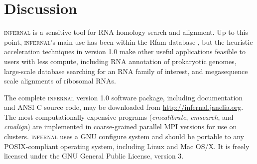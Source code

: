 \section{Discussion}

\textsc{infernal} is a sensitive tool for RNA homology search and
alignment. Up to this point, \textsc{infernal}'s main use has been
within the Rfam database \cite{Gardner09}, but the heuristic
acceleration techniques in version 1.0 make other useful applications
feasible to users with less compute, including RNA annotation of
prokaryotic genomes, large-scale database searching for an RNA
family of interest, and megasequence scale alignments of ribosomal
RNAs.  






The complete \textsc{infernal} version 1.0 software package, including
documentation and ANSI C source code, may be downloaded from
\url{http://infernal.janelia.org}. The most computationally expensive
programs (\emph{cmcalibrate}, \emph{cmsearch}, and \emph{cmalign}) are
implemented in coarse-grained parallel MPI versions for use on
clusters.  \textsc{infernal} uses a GNU configure system and should be
portable to any POSIX-compliant operating system, including Linux and
Mac OS/X. It is freely licensed under the GNU General Public License,
version 3.
